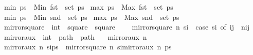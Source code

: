 \begin{isabellebody}
\ {\isachardoublequoteopen}min{}\ ps\ {\isasymequiv}\ Min\ {\isacharparenleft}{\kern0pt}{\isacharparenleft}{\kern0pt}fst{\isacharparenright}{\kern0pt}\ {\isacharbackquote}{\kern0pt}\ set\ ps{\isacharparenright}{\kern0pt}{\isachardoublequoteclose}\isanewline
{}\isamarkupfalse%
\ {\isachardoublequoteopen}max{}\ ps\ {\isasymequiv}\ Max\ {\isacharparenleft}{\kern0pt}{\isacharparenleft}{\kern0pt}fst{\isacharparenright}{\kern0pt}\ {\isacharbackquote}{\kern0pt}\ set\ ps{\isacharparenright}{\kern0pt}{\isachardoublequoteclose}\isanewline
{}\isamarkupfalse%
\ {\isachardoublequoteopen}min{}\ ps\ {\isasymequiv}\ Min\ {\isacharparenleft}{\kern0pt}{\isacharparenleft}{\kern0pt}snd{\isacharparenright}{\kern0pt}\ {\isacharbackquote}{\kern0pt}\ set\ ps{\isacharparenright}{\kern0pt}{\isachardoublequoteclose}\isanewline
{}\isamarkupfalse%
\ {\isachardoublequoteopen}max{}\ ps\ {\isasymequiv}\ Max\ {\isacharparenleft}{\kern0pt}{\isacharparenleft}{\kern0pt}snd{\isacharparenright}{\kern0pt}\ {\isacharbackquote}{\kern0pt}\ set\ ps{\isacharparenright}{\kern0pt}{\isachardoublequoteclose}\isanewline
\isanewline
{}\isamarkupfalse%
\ mirror{}{\isacharunderscore}{\kern0pt}square\ {\isacharcolon}{\kern0pt}{\isacharcolon}{\kern0pt}\ {\isachardoublequoteopen}int\ {\isasymRightarrow}\ square\ {\isasymRightarrow}\ square{\isachardoublequoteclose}\ \ \isanewline
\ \ {\isachardoublequoteopen}mirror{}{\isacharunderscore}{\kern0pt}square\ n\ s\isactrlsub i\ {\isacharequal}{\kern0pt}\ {\isacharparenleft}{\kern0pt}case\ s\isactrlsub i\ of\ {\isacharparenleft}{\kern0pt}i{\isacharcomma}{\kern0pt}j{\isacharparenright}{\kern0pt}\ {\isasymRightarrow}\ {\isacharparenleft}{\kern0pt}n{\isacharminus}{\kern0pt}i{\isacharcomma}{\kern0pt}j{\isacharparenright}{\kern0pt}{\isacharparenright}{\kern0pt}{\isachardoublequoteclose}\isanewline
\isanewline
{}\isamarkupfalse%
\ mirror{}{\isacharunderscore}{\kern0pt}aux\ {\isacharcolon}{\kern0pt}{\isacharcolon}{\kern0pt}\ {\isachardoublequoteopen}int\ {\isasymRightarrow}\ path\ {\isasymRightarrow}\ path{\isachardoublequoteclose}\ \isanewline
\ \ {\isachardoublequoteopen}mirror{}{\isacharunderscore}{\kern0pt}aux\ n\ {\isacharbrackleft}{\kern0pt}{\isacharbrackright}{\kern0pt}\ {\isacharequal}{\kern0pt}\ {\isacharbrackleft}{\kern0pt}{\isacharbrackright}{\kern0pt}{\isachardoublequoteclose}\isanewline
{\isacharbar}{\kern0pt}\ {\isachardoublequoteopen}mirror{}{\isacharunderscore}{\kern0pt}aux\ n\ {\isacharparenleft}{\kern0pt}s\isactrlsub i{\isacharhash}{\kern0pt}ps{\isacharparenright}{\kern0pt}\ {\isacharequal}{\kern0pt}\ {\isacharparenleft}{\kern0pt}mirror{}{\isacharunderscore}{\kern0pt}square\ n\ s\isactrlsub i{\isacharparenright}{\kern0pt}{\isacharhash}{\kern0pt}mirror{}{\isacharunderscore}{\kern0pt}aux\ n\ ps{\isachardoublequoteclose}\isanewline

\end{isabellebody}
